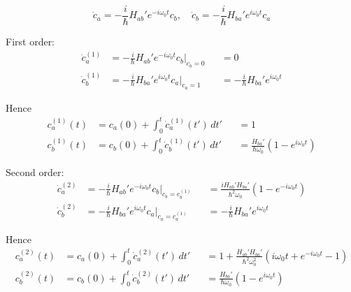 


\begin{equation*}
\dot c_a=-\frac{i}{\hbar}H_{ab}'e^{-i\omega_0t}c_b,\quad
\dot c_b=-\frac{i}{\hbar}H_{ba}'e^{i\omega_0t}c_a
\tag{11.17}
\end{equation*}

First order:
\begin{align*}
\dot c_a^{(1)}&=-\frac{i}{\hbar}H_{ab}'e^{-i\omega_0t}c_b\bigg|_{c_b=0}
&&=0
\\
\dot c_b^{(1)}&=-\frac{i}{\hbar}H_{ba}'e^{i\omega_0t}c_a\bigg|_{c_a=1}
&&=-\frac{i}{\hbar}H_{ba}'e^{i\omega_0t}
\end{align*}

Hence
\begin{align*}
c_a^{(1)}(t)&=c_a(0)+\int_0^t\dot c_a^{(1)}(t')\,dt'
&&=1
\\
c_b^{(1)}(t)&=c_b(0)+\int_0^t\dot c_b^{(1)}(t')\,dt'
&&=\frac{H_{ba}'}{\hbar\omega_0}\left(1-e^{i\omega_0t}\right)
\end{align*}

Second order:
\begin{align*}
\dot c_a^{(2)}&=-\frac{i}{\hbar}H_{ab}'e^{-i\omega_0t}c_b\bigg|_{c_b=c_b^{(1)}}
& &=\frac{iH_{ab}'H_{ba}'}{\hbar^2\omega_0}\left(1-e^{-i\omega_0t}\right)
\\
\dot c_b^{(2)}&=-\frac{i}{\hbar}H_{ba}'e^{i\omega_0t}c_a\bigg|_{c_a=c_a^{(1)}}
& &=-\frac{i}{\hbar}H_{ba}'e^{i\omega_0t}
\end{align*}

Hence
\begin{align*}
c_a^{(2)}(t)&=c_a(0)+\int_0^t\dot c_a^{(2)}(t')\,dt'
&&=1+\frac{H_{ab}'H_{ba}'}{\hbar^2\omega_0^2}
\left(i\omega_0t+e^{-i\omega_0t}-1\right)
\\
c_b^{(2)}(t)&=c_b(0)+\int_0^t\dot c_b^{(2)}(t')\,dt'
&&=\frac{H_{ba}'}{\hbar\omega_0}\left(1-e^{i\omega_0t}\right)
\end{align*}


